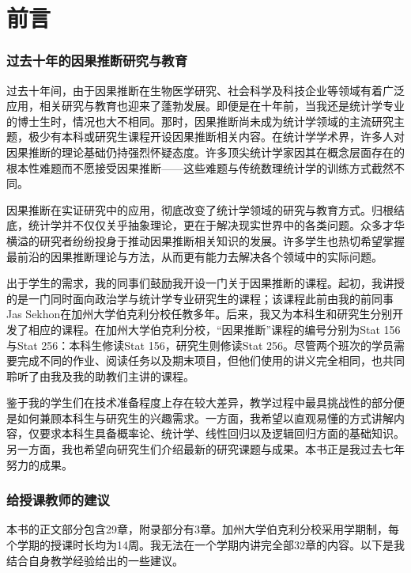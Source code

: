 \chapter*{前言}




\subsection*{过去十年的因果推断研究与教育}



过去十年间，由于因果推断在生物医学研究、社会科学及科技企业等领域有着广泛应用，相关研究与教育也迎来了蓬勃发展。即便是在十年前，当我还是统计学专业的博士生时，情况也大不相同。那时，因果推断尚未成为统计学领域的主流研究主题，极少有本科或研究生课程开设因果推断相关内容。在统计学学术界，许多人对因果推断的理论基础仍持强烈怀疑态度。许多顶尖统计学家因其在概念层面存在的根本性难题而不愿接受因果推断——这些难题与传统数理统计学的训练方式截然不同。 


因果推断在实证研究中的应用，彻底改变了统计学领域的研究与教育方式。归根结底，统计学并不仅仅关乎抽象理论，更在于解决现实世界中的各类问题。众多才华横溢的研究者纷纷投身于推动因果推断相关知识的发展。许多学生也热切希望掌握最前沿的因果推断理论与方法，从而更有能力去解决各个领域中的实际问题。 



出于学生的需求，我的同事们鼓励我开设一门关于因果推断的课程。起初，我讲授的是一门同时面向政治学与统计学专业研究生的课程；该课程此前由我的前同事Jas Sekhon在加州大学伯克利分校任教多年。后来，我又为本科生和研究生分别开发了相应的课程。在加州大学伯克利分校，“因果推断”课程的编号分别为Stat 156与Stat 256：本科生修读Stat 156，研究生则修读Stat 256。尽管两个班次的学员需要完成不同的作业、阅读任务以及期末项目，但他们使用的讲义完全相同，也共同聆听了由我及我的助教们主讲的课程。  


鉴于我的学生们在技术准备程度上存在较大差异，教学过程中最具挑战性的部分便是如何兼顾本科生与研究生的兴趣需求。一方面，我希望以直观易懂的方式讲解内容，仅要求本科生具备概率论、统计学、线性回归以及逻辑回归方面的基础知识。另一方面，我也希望向研究生们介绍最新的研究课题与成果。本书正是我过去七年努力的成果。  



\subsection*{给授课教师的建议}



本书的正文部分包含29章，附录部分有3章。加州大学伯克利分校采用学期制，每个学期的授课时长均为14周。我无法在一个学期内讲完全部32章的内容。以下是我结合自身教学经验给出的一些建议。


